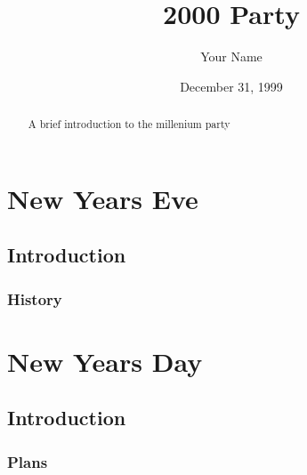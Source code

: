 \documentclass[]{report}   %
\begin{document}
\title{2000 Party}   %
\author{Your Name}         %
\date{December 31, 1999}    %
\maketitle

\begin{abstract}
  A brief introduction to the millenium party
\end{abstract}

\chapter{New Years Eve}             %
\section{Introduction}     %
\subsection{History}       %

\chapter{New Years Day}           %
\section{Introduction}     %
\subsection{Plans}         %


\begin{thebibliography}{9}
\end{thebibliography}
\end{document}
